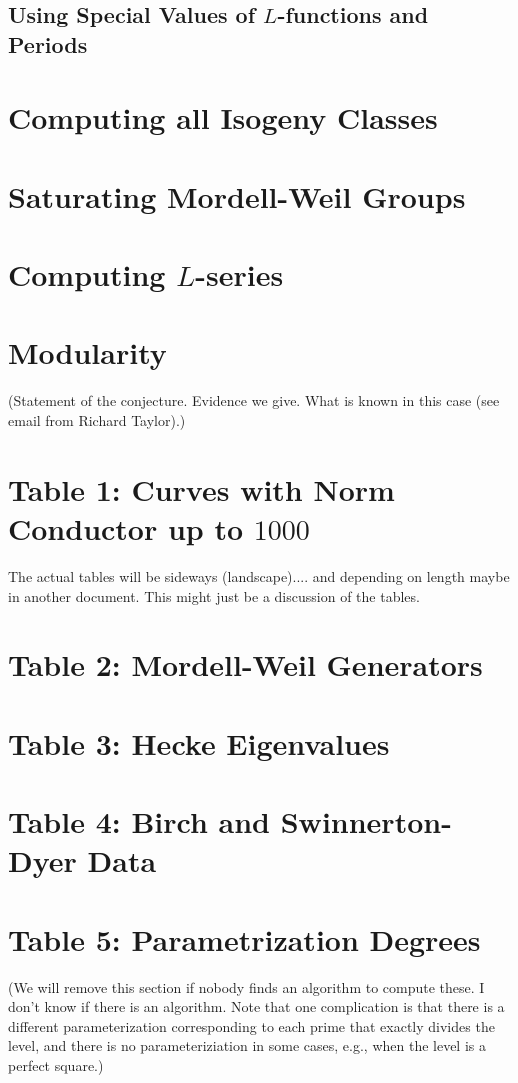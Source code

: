 \documentclass{article}
\begin{document}
\subsection{Using Special Values of $L$-functions and Periods}
    


\section{Computing all Isogeny Classes}

\section{Saturating Mordell-Weil Groups}

\section{Computing $L$-series}

\section{Modularity}

(Statement of the conjecture.  Evidence we give.   What is known in this case (see email from Richard Taylor).)

\section{Table 1: Curves with Norm Conductor up to $1000$}


The actual tables will be sideways (landscape).... and depending on
length maybe in another document.  This might just be a discussion of
the tables.

\section{Table 2: Mordell-Weil Generators}

\section{Table 3: Hecke Eigenvalues}

\section{Table 4: Birch and Swinnerton-Dyer Data}

\section{Table 5: Parametrization Degrees}

(We will remove this section if nobody finds an algorithm to compute
these.  I don't know if there is an algorithm.  Note that one
complication is that there is a different parameterization
corresponding to each prime that exactly divides the level, and there
is no parameteriziation in some cases, e.g., when the level is a
perfect square.)




\end{document}
